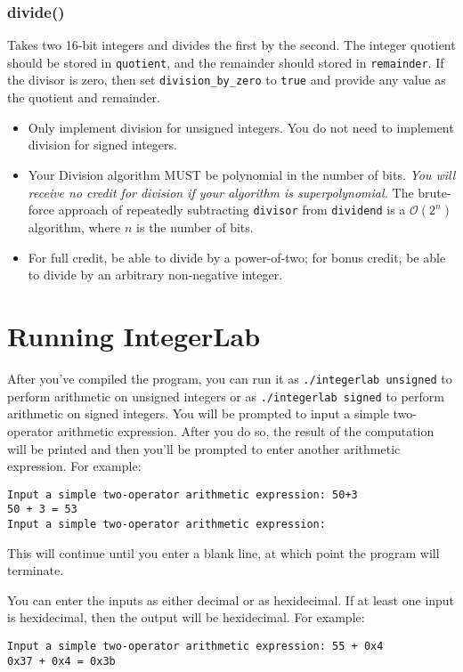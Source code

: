 \subsubsection*{divide()}  Takes two 16-bit integers and divides the first by
the second.  The integer quotient should be stored in \lstinline{quotient}, and
the remainder should stored in \lstinline{remainder}.  If the divisor is zero,
then set \lstinline{division_by_zero} to \lstinline{true} and provide any value
as the quotient and remainder.
\begin{itemize}
\item Only implement division for unsigned integers.  You do not need to
    implement division for signed integers.
\item Your Division algorithm MUST be polynomial in the number of bits.
    \textit{You will receive no credit for division if your algorithm is
    superpolynomial.} The brute-force approach of repeatedly subtracting
    \lstinline{divisor} from \lstinline{dividend} is a $\mathcal{O}(2^n)$
    algorithm, where $n$ is the number of bits.
\item For full credit, be able to divide by a power-of-two; for bonus credit,
    be able to divide by an arbitrary non-negative integer.
\end{itemize}


\section{Running IntegerLab}

After you've compiled the program, you can run it as
\texttt{./integerlab~unsigned} to perform arithmetic on unsigned integers or as
\texttt{./integerlab~signed} to perform arithmetic on signed integers.  You
will be prompted to input a simple two-operator arithmetic expression.  After
you do so, the result of the computation will be printed and then you'll be
prompted to enter another arithmetic expression.  For example:
\begin{verbatim}
Input a simple two-operator arithmetic expression: 50+3
50 + 3 = 53
Input a simple two-operator arithmetic expression:
\end{verbatim}
This will continue until you enter a blank line, at which point the program
will terminate.

You can enter the inputs as either decimal or as hexidecimal.  If at least one
input is hexidecimal, then the output will be hexidecimal.  For example:
\begin{verbatim}
Input a simple two-operator arithmetic expression: 55 + 0x4
0x37 + 0x4 = 0x3b
\end{verbatim}

